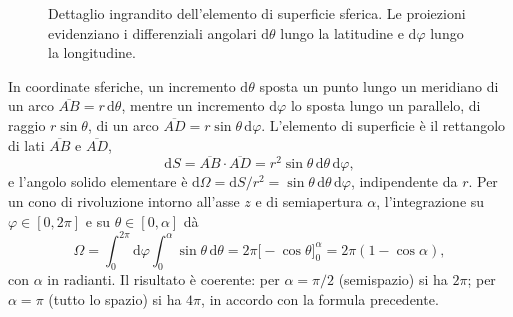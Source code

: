 \documentclass[11pt,a4paper]{article}
\newcommand{\dd}{\mathrm{d}}
\begin{document}
\begin{figure}[htbp]
	\caption{Dettaglio ingrandito dell'elemento di superficie sferica. Le proiezioni evidenziano i differenziali angolari $\mathrm{d}\theta$ lungo la latitudine e $\mathrm{d}\varphi$ lungo la longitudine.}
	\label{fig:zoom_elemento_superficie}
\end{figure}

In coordinate sferiche, un incremento $\dd\theta$ sposta un punto lungo un meridiano di un arco $\overline{AB}=r\,\dd\theta$, mentre un incremento $\dd\varphi$ lo sposta lungo un parallelo, di raggio $r\sin\theta$, di un arco $\overline{AD}=r\sin\theta\,\dd\varphi$. L'elemento di superficie è il rettangolo di lati $\overline{AB}$ e $\overline{AD}$,
\[
\dd S=\overline{AB}\cdot\overline{AD}=r^2\sin\theta\,\dd\theta\,\dd\varphi ,
\]
e l'angolo solido elementare è $\dd\Omega=\dd S/r^2=\sin\theta\,\dd\theta\,\dd\varphi$, indipendente da $r$. Per un cono di rivoluzione intorno all'asse $z$ e di semiapertura $\alpha$, l'integrazione su $\varphi\in[0,2\pi]$ e su $\theta\in[0,\alpha]$ dà
\[
\Omega=\int_0^{2\pi}\dd\varphi\int_0^{\alpha}\sin\theta\,\dd\theta=2\pi\bigl[-\cos\theta\bigr]_0^{\alpha}=2\pi(1-\cos\alpha) ,
\]
con $\alpha$ in radianti. Il risultato è coerente: per $\alpha=\pi/2$ (semispazio) si ha $2\pi$; per $\alpha=\pi$ (tutto lo spazio) si ha $4\pi$, in accordo con la formula precedente.
\end{document}
